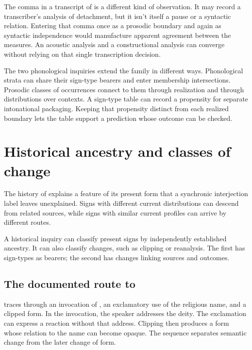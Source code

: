 \documentclass[12pt]{article}
\begin{document}
The comma in a transcript of 
is a different kind of observation. It may record a transcriber's
analysis of detachment, but it isn't itself a pause or a syntactic
relation. Entering that comma once as a prosodic boundary and again
as syntactic independence would manufacture apparent agreement between
the measures. An acoustic analysis and a constructional analysis can
converge without relying on that single transcription decision.

The two phonological inquiries extend the family in different ways. Phonological strata can share their sign-type bearers and
enter membership intersections. Prosodic classes of occurrences connect
to them through realization and through distributions over contexts.
A sign-type table can record a propensity for separate intonational
packaging. Keeping that propensity distinct from each realized boundary
lets the table support a prediction whose outcome can be checked.

\section{Historical ancestry and classes of change}\label{sec:history}

The history of  explains a feature of its present form
that a synchronic interjection label leaves unexplained. Signs with
different current distributions can descend from related sources, while
signs with similar current profiles can arrive by different routes.

A historical inquiry can classify present signs by independently established
ancestry. It can also classify changes, such as clipping or reanalysis.
The first has sign-types as bearers; the second has changes linking
sources and outcomes.

\subsection{The documented route to }

\textcite{gehweiler2008} traces  through an invocation of ,
an exclamatory use of the religious name, and a clipped form. In the invocation, the speaker addresses the deity.
The exclamation can express a reaction without that address. Clipping
then produces a form whose relation to the name can become opaque.
The sequence separates semantic change from the later change of form.
\end{document}
